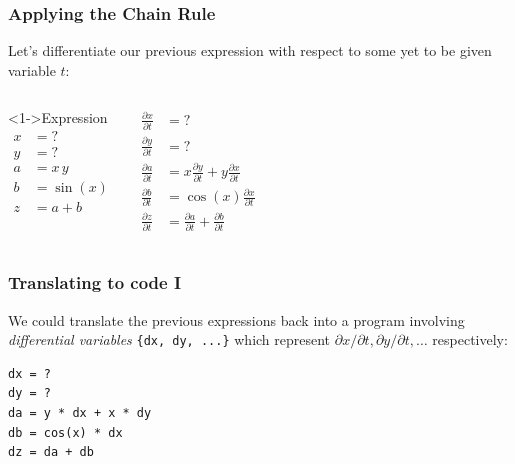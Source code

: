 \documentclass[]{article}
\begin{document}
\begin{frame}
\frametitle{Applying the Chain Rule}

Let's differentiate our previous expression with respect to some yet to be given variable $t$:
\begin{columns}
\begin{block}<1->{Expression}
    \vspace{-1.5em}
    \begin{align*}
			x & = ? \\
			y & = ? \\
			a & = x \, y \\
			b & = \sin(x) \\
			z & = a + b
		\end{align*}
    \end{block}

\begin{align*}
	\frac{\partial x}{\partial t} & = ? \\
	\frac{\partial y}{\partial t} & = ? \\
	\frac{\partial a}{\partial t} & = x \frac{\partial y}{\partial t} + y \frac{\partial x}{\partial t}\\
	\frac{\partial b}{\partial t} & = \cos(x) \frac{\partial x}{\partial t}\\
	\frac{\partial z}{\partial t} & = \frac{\partial a}{\partial t} + \frac{\partial b}{\partial t}
\end{align*}
\end{columns}
\vfill
 

\end{frame}

\begin{frame}[fragile]
\frametitle{Translating to code I}
We could translate the previous expressions back into a program involving \emph{differential variables} \lstinline!{dx, dy, ...}! which represent $\partial x/\partial t, \partial y/\partial t, \dots$ respectively:

\begin{lstlisting}
dx = ?
dy = ?
da = y * dx + x * dy
db = cos(x) * dx
dz = da + db	
\end{lstlisting}

\end{frame}
\end{document}
